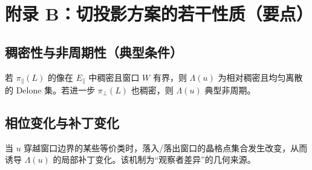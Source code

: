 \section{附录 B：切投影方案的若干性质（要点）}
\label{app:cut-project-properties}

\subsection{稠密性与非周期性（典型条件）}

若 $\pi_{\parallel}(L)$ 的像在 $E_{\parallel}$ 中稠密且窗口 $W$ 有界，则 $\Lambda(u)$ 为相对稠密且均匀离散的 Delone 集。若进一步 $\pi_{\perp}(L)$ 也稠密，则 $\Lambda(u)$ 典型非周期。

\subsection{相位变化与补丁变化}

当 $u$ 穿越窗口边界的某些等价类时，落入/落出窗口的晶格点集合发生改变，从而诱导 $\Lambda(u)$ 的局部补丁变化。该机制为“观察者差异”的几何来源。

